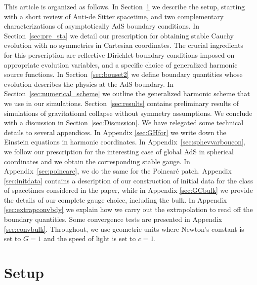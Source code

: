 \documentclass[a4paper,11pt]{article}
\numberwithin{equation}{section}
\begin{document}
This article is organized as follows.
In Section~\ref{sec:setup} we describe the setup, starting with a short review of Anti-de Sitter spacetime, and two complementary characterizations of asymptotically AdS boundary conditions.
In Section~\ref{sec:pre_sta} we detail our prescription for obtaining stable Cauchy evolution with no symmetries in Cartesian coordinates. 
The crucial ingredients for this perscription are reflective Dirichlet boundary conditions imposed on appropriate evolution variables, and a specific choice of generalized harmonic source functions. In Section~\ref{sec:bouset2} we define boundary quantities whose evolution describes the physics at the AdS boundary.
In Section~\ref{sec:numerical_scheme} we outline the generalized harmonic scheme that we use in our simulations. 
Section~\ref{sec:results} contains preliminary results of simulations of gravitational collapse without symmetry assumptions.
We conclude with a discussion in Section~\ref{sec:Discussion}. We have relegated some technical details to several appendices.  In Appendix \ref{sec:GHfor} we write down the Einstein equations in harmonic coordinates.   In Appendix~\ref{sec:sphevvarboucon}, we follow our prescription for the interesting case of global AdS in spherical coordinates and we obtain the corresponding stable gauge.  In Appendix~\ref{sec:poincare}, we do the same for the Poincar\'e patch.  Appendix \ref{sec:initdata}  contains a  description of our construction of initial data for the class of spacetimes considered in the paper, while in Appendix \ref{sec:GCbulk} we provide the details of our complete gauge choice, including the bulk.  In Appendix \ref{sec:extrapconvbdy} we explain how we carry out the extrapolation to read off the boundary quantities. Some convergence tests are presented in Appendix \ref{sec:convbulk}.
Throughout, we use geometric units where Newton's constant is set to $G=1$ and the speed of light is set to $c=1$.

\section{Setup}\label{sec:setup}
\end{document}
